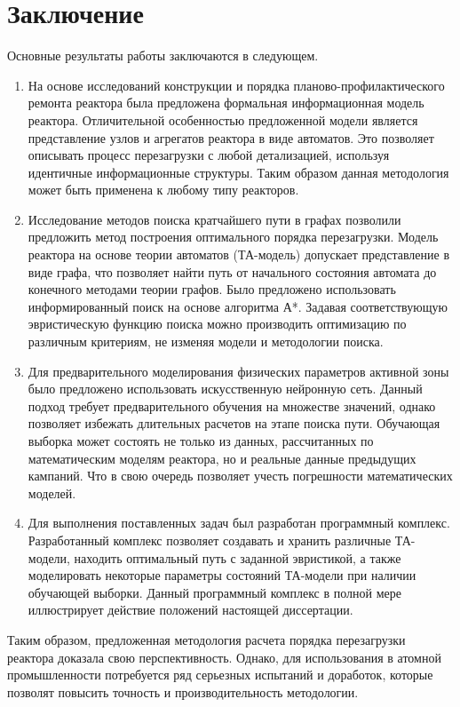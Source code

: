 \chapter*{Заключение}						%

Основные результаты работы заключаются в следующем.
\begin{enumerate}
  \item На основе исследований конструкции и порядка планово-профилактического ремонта реактора была предложена формальная информационная модель реактора.
  Отличительной особенностью предложенной модели является представление узлов и агрегатов реактора в виде автоматов.
  Это позволяет описывать процесс перезагрузки с любой детализацией, используя идентичные информационные структуры.
  Таким образом данная методология может быть применена к любому типу реакторов. 
  \item Исследование методов поиска кратчайшего пути в графах позволили предложить метод построения оптимального порядка перезагрузки.
  Модель реактора на основе теории автоматов (ТА-модель) допускает представление в виде графа, что позволяет найти путь от начального состояния автомата до конечного методами теории графов.
  Было предложено использовать информированный поиск на основе алгоритма А*.
  Задавая соответствующую эвристическую функцию поиска можно производить оптимизацию по различным критериям, не изменяя модели и методологии поиска. 
  \item Для предварительного моделирования физических параметров активной зоны было предложено использовать искусственную нейронную сеть.
  Данный подход требует предварительного обучения на множестве значений, однако позволяет избежать длительных расчетов на этапе поиска пути.
  Обучающая выборка может состоять не только из данных, рассчитанных по математическим моделям реактора, но и реальные данные предыдущих кампаний.
  Что в свою очередь позволяет учесть погрешности математических моделей.
  \item Для выполнения поставленных задач был разработан программный комплекс.
  Разработанный комплекс позволяет создавать и хранить различные ТА-модели, находить оптимальный путь с заданной эвристикой, а также моделировать некоторые параметры состояний ТА-модели при наличии обучающей выборки.
  Данный программный комплекс в полной мере иллюстрирует действие положений настоящей диссертации.
  
\end{enumerate}

Таким образом, предложенная методология расчета порядка перезагрузки реактора доказала свою перспективность.
Однако, для использования в атомной промышленности потребуется ряд серьезных испытаний и доработок, которые позволят повысить точность и производительность методологии.

\clearpage
